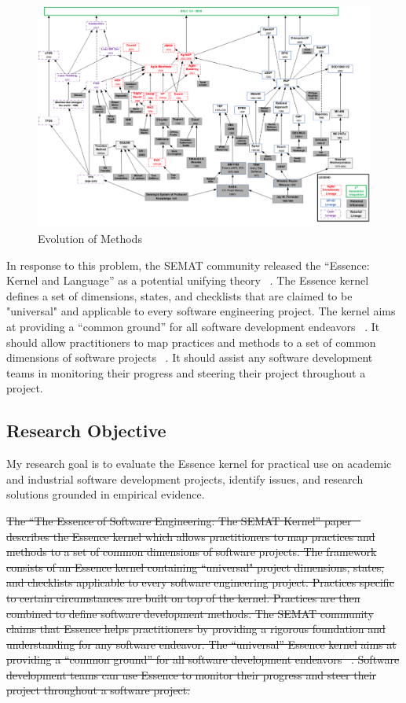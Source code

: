 \documentclass[preprint,12pt,3p]{elsarticle}
\begin{document}
\begin{figure}[h]\vspace*{4pt}
\centerline{\includegraphics[width=6.4in]{field_study_images/EvolutionOfMethods}}
\caption{Evolution of Methods}\vspace*{-6pt}\label{EvolutionOfMethods}
\end{figure}

In response to this problem, the SEMAT community released the “Essence: Kernel and Language” as a potential unifying theory  ~\cite{OMGStandard}. The Essence kernel defines a set of dimensions, states, and checklists that are claimed to be "universal" and applicable to every software engineering project. The kernel aims at providing a “common ground” for all software development endeavors ~\cite{JacobsonQueue}. It should allow practitioners to map practices and methods to a set of common dimensions of software projects ~\cite{JacobsonQueue}.  It should assist any software development teams in monitoring their progress and steering their project throughout a project.

\subsection{Research Objective}
My research goal is to evaluate the Essence kernel for practical use on academic and industrial software development projects, identify issues, and research solutions grounded in empirical evidence.

\sout{The ``The Essence of Software Engineering: The SEMAT Kernel'' paper ~\cite{JacobsonQueue} describes the Essence kernel which allows practitioners to map practices and methods to a set of common dimensions of software projects. The framework consists of an Essence kernel containing ``universal" project dimensions, states, and checklists applicable to every software engineering project. Practices specific to certain circumstances are built on top of the kernel. Practices are then combined to define software development methods. The SEMAT community claims that Essence helps practitioners by providing a rigorous foundation and understanding for any software endeavor.  The “universal” Essence kernel aims at providing a “common ground” for all software development endeavors ~\cite{JacobsonQueue}. Software development teams can use Essence to monitor their progress and steer their project throughout a software project. }
\end{document}
